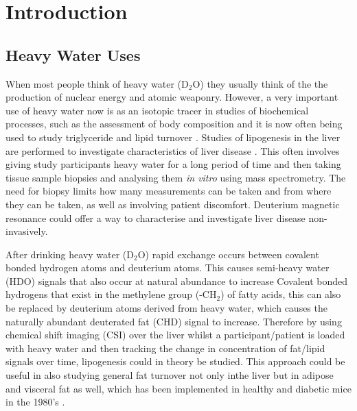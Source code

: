 \documentclass[class=article, crop=false]{standalone}
\begin{document}
 
\label{Chap:D2O}

\section{Introduction}

\subsection{Heavy Water Uses}

When most people think of heavy water (D$_{2}$O) they usually think of the the production of nuclear energy and atomic weaponry. However, a very important use of heavy water now is as an isotopic tracer in studies of biochemical processes, such as the assessment of body composition \cite{INTERNATIONALATOMICENERGYAGENCY2011IntroductionSpectrometry} and it is now often being used to study triglyceride \cite{Strawford2004AdiposeO} and lipid turnover \cite{Wilkinson2017StableFuture}. Studies of lipogenesis in the liver are performed to investigate characteristics of liver disease \cite{Turner2003MeasurementMIDA}. This often involves giving study participants heavy water for a long period of time and then taking tissue sample biopsies and analysing them \textit{in vitro} using mass spectrometry. The need for biopsy limits how many measurements can be taken and from where they can be taken, as well as involving patient discomfort. Deuterium magnetic resonance could offer a way to characterise and investigate liver disease non-invasively. 

After drinking heavy water (D$_2$O) rapid exchange occurs between covalent bonded hydrogen atoms and deuterium atoms. This causes semi-heavy water (HDO) signals that also occur at natural abundance to increase Covalent bonded hydrogens that exist in the methylene group (-CH$_2$) of fatty acids, this can also be replaced by deuterium atoms derived from heavy water, which causes the naturally abundant deuterated fat (CHD) signal to increase. Therefore by using chemical shift imaging (CSI) over the liver whilst a participant/patient is loaded with heavy water and then tracking the change in concentration of fat/lipid signals over time, lipogenesis could in theory be studied. This approach could be useful in also studying general fat turnover not only inthe liver but in adipose and visceral fat as well, which has been implemented in healthy and diabetic mice in the 1980's \cite{Brereton1986PreliminarySpectroscopy,Brereton1989TheMice}.

\end{document}
